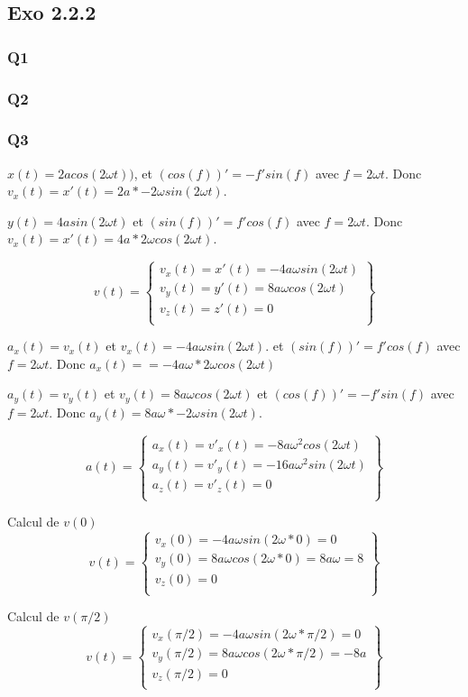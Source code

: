 \documentclass[]{book}
\theoremstyle{definition}
\begin{document}
\subsection*{Exo 2.2.2}
\subsubsection*{Q1}



\subsubsection*{Q2}


\subsubsection*{Q3}
$x(t) = 2acos(2\omega t))$, et $\left(cos(f)\right)' = -f'sin(f)$ avec
$f=2\omega t$. Donc
$v_x(t) = x'(t) = 2a*-2\omega sin(2\omega t)$.


$y(t)=4asin(2\omega t)$ et $\left(sin(f)\right)' = f'cos(f)$ avec
$f=2\omega t$. Donc 
$v_x(t) = x'(t) = 4a*2\omega cos(2\omega t)$.


$$
v(t) = \left\{
\begin{array}{l} 
  v_x(t) = x'(t) = -4a\omega sin(2\omega t) \\
  v_y(t) = y'(t) =  8a \omega cos(2\omega t)\\
  v_z(t) = z'(t) =  0 \\
\end{array}
\right\}
$$

$a_x(t) = v_x(t)$ et $v_x(t) = -4a\omega sin(2\omega t)$. et $\left(sin(f)\right)' = f'cos(f)$ avec
$f=2\omega t$. Donc 
$a_x(t) = = -4a\omega * 2 \omega cos(2\omega t)$

$a_y(t) = v_y(t)$ et $v_y(t) = 8a \omega cos(2\omega t)$ et $\left(cos(f)\right)' = -f'sin(f)$ avec
$f=2\omega t$. Donc
$a_y(t) = 8a \omega *-2 \omega sin(2\omega t)$.


$$a(t) = \left\{
\begin{array}{l} 
  a_x(t) = v'_x(t) = -8a \omega^2 cos(2\omega t)\\
  a_y(t) = v'_y(t) = -16a \omega^2 sin(2 \omega t) \\
  a_z(t) = v'_z(t) = 0 \\
\end{array}
\right\}
$$


Calcul de $v(0)$
$$
v(t) = \left\{
\begin{array}{l} 
  v_x(0) = -4a\omega sin(2\omega * 0) = 0\\
  v_y(0) =  8a \omega cos(2\omega * 0) = 8a\omega = 8\\
  v_z(0) =  0 \\
\end{array}
\right\}
$$

Calcul de $v(\pi/2)$
$$
v(t) = \left\{
\begin{array}{l} 
  v_x(\pi/2) =  -4a\omega sin(2\omega * \pi/2) = 0\\
  v_y(\pi/2) =  8a \omega cos(2\omega * \pi/2) = -8a\\
  v_z(\pi/2) =  0 \\
\end{array}
\right\}
$$
\end{document}
